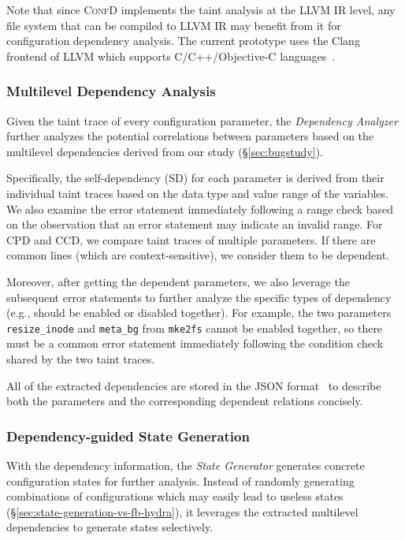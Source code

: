 {Note that since \textsc{ConfD} implements the taint analysis at the LLVM IR level, any file system that can be compiled to LLVM IR may benefit from it for configuration dependency analysis. The current prototype uses the Clang frontend of LLVM which supports C/C++/Objective-C languages~\cite{LLVM}.}



\subsubsection{Multilevel Dependency Analysis}
\label{sec:dependencyAnalysis}
Given the taint trace of every configuration parameter, the \textit{Dependency Analyzer} further analyzes the potential correlations between   parameters based on the multilevel dependencies  derived from our study  (\S\ref{sec:bugstudy}). 

Specifically,  
the self-dependency (SD) for each parameter is derived from their individual taint traces based on the data type and value range of the  variables. We also examine the  error statement immediately following a range check based on the observation that an error statement may indicate an invalid range. 
For CPD and CCD, we  compare taint traces of multiple parameters.
If there are common lines   (which are context-sensitive), we consider them to be dependent. 

Moreover, 
after getting the dependent parameters, we also leverage the subsequent error statements to further analyze the specific types of dependency (e.g.,  should be enabled or disabled together).  For example, the two parameters  \texttt{resize\_inode} and \texttt{meta\_bg} from \texttt{mke2fs}  cannot be enabled together, so there must be a common error statement immediately following the condition check shared by the two taint traces.

All of the extracted dependencies are stored in the JSON format~\cite{JSON} to describe both the parameters and the corresponding dependent relations concisely.

\subsubsection{Dependency-guided State Generation}
\label{sec:stategenerator}

With the dependency information, the \textit{State Generator} generates concrete configuration states for further analysis.  Instead of randomly generating combinations of configurations which may easily lead to useless states (\S\ref{sec:state-generation-vs-fb-hydra}), 
 it leverages the 
extracted multilevel  dependencies to generate states selectively.
 
